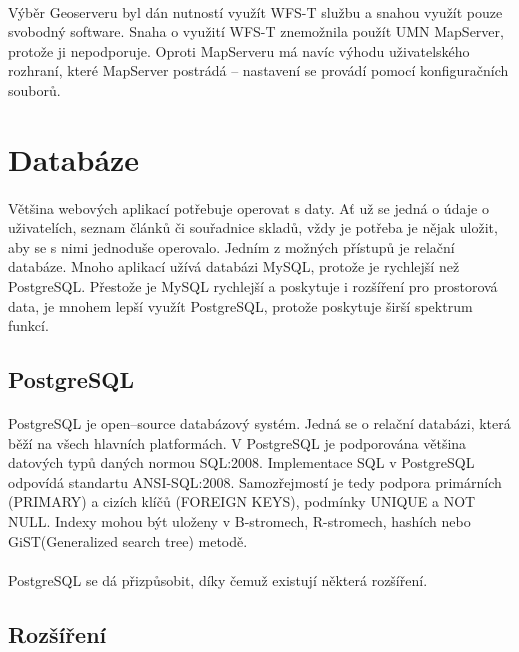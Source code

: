 \documentclass[11pt,a4paper,titlepage,oneside]{book}
\begin{document}
			\paragraph{} Výběr Geoserveru byl dán nutností využít WFS-T službu a snahou využít pouze svobodný software. Snaha o využití WFS-T znemožnila použít UMN MapServer, protože ji nepodporuje. Oproti MapServeru má navíc výhodu uživatelského rozhraní, které MapServer postrádá -- nastavení se provádí pomocí konfiguračních souborů.

	\section{Databáze}
		\paragraph{} Většina webových aplikací potřebuje operovat s daty. Ať už se jedná o údaje o uživatelích, seznam článků či souřadnice skladů, vždy je potřeba je nějak uložit, aby se s nimi jednoduše operovalo. Jedním z možných přístupů je relační databáze. Mnoho aplikací užívá databázi MySQL, protože je rychlejší než PostgreSQL. Přestože je MySQL rychlejší a poskytuje i rozšíření pro prostorová data, je mnohem lepší využít PostgreSQL, protože poskytuje širší spektrum funkcí.
		\subsection{PostgreSQL}
			\paragraph{} PostgreSQL je open--source databázový systém. Jedná se o relační databázi, která běží na všech hlavních platformách. V PostgreSQL je podporována většina datových typů daných normou SQL:2008. Implementace SQL v PostgreSQL odpovídá standartu ANSI-SQL:2008\cite{postgresql}. Samozřejmostí je tedy podpora primárních (PRIMARY) a cizích klíčů (FOREIGN KEYS), podmínky UNIQUE a NOT NULL. Indexy mohou být uloženy v B-stromech, R-stromech, hashích nebo GiST(Generalized search tree) metodě.
			\paragraph{} PostgreSQL se dá přizpůsobit, díky čemuž existují některá rozšíření.
		\subsection{Rozšíření}
\end{document}
